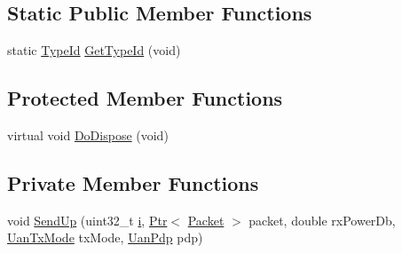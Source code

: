 \subsection*{Static Public Member Functions}
\begin{DoxyCompactItemize}
\item 
static \hyperlink{classns3_1_1TypeId}{Type\+Id} \hyperlink{classns3_1_1UanChannel_aa9a0cf23b0c785a2df08dabbffdf0522}{Get\+Type\+Id} (void)
\end{DoxyCompactItemize}
\subsection*{Protected Member Functions}
\begin{DoxyCompactItemize}
\item 
virtual void \hyperlink{classns3_1_1UanChannel_a90ac4f5b3e8401c93cdabbd7e5a3a708}{Do\+Dispose} (void)
\end{DoxyCompactItemize}
\subsection*{Private Member Functions}
\begin{DoxyCompactItemize}
\item 
void \hyperlink{classns3_1_1UanChannel_af232fa9b7e8e9520a2d393149206c11a}{Send\+Up} (uint32\+\_\+t \hyperlink{lte__uplink__power__control_8m_a6f6ccfcf58b31cb6412107d9d5281426}{i}, \hyperlink{classns3_1_1Ptr}{Ptr}$<$ \hyperlink{classns3_1_1Packet}{Packet} $>$ packet, double rx\+Power\+Db, \hyperlink{classns3_1_1UanTxMode}{Uan\+Tx\+Mode} tx\+Mode, \hyperlink{classns3_1_1UanPdp}{Uan\+Pdp} pdp)
\end{DoxyCompactItemize}
